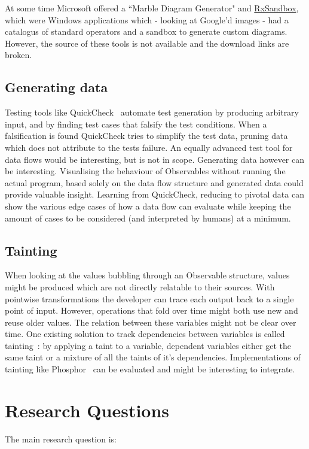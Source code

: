 \documentclass[11pt,a4paper]{article}
\begin{document}
At some time Microsoft offered a ``Marble Diagram Generator" and \href{http://mnajder.blogspot.nl/2010/03/rxsandbox-v1.html}{RxSandbox}, which were Windows applications which - looking at Google'd images - had a catalogus of standard operators and a sandbox to generate custom diagrams. However, the source of these tools is not available and the download links are broken.

\subsection{Generating data}
Testing tools like QuickCheck~\cite{quickcheck} automate test generation by producing arbitrary input, and by finding test cases that falsify the test conditions. When a falsification is found QuickCheck tries to simplify the test data, pruning data which does not attribute to the tests failure. An equally advanced test tool for data flows would be interesting, but is not in scope. Generating data however can be interesting. Visualising the behaviour of Observables without running the actual program, based solely on the data flow structure and generated data could provide valuable insight. Learning from QuickCheck, reducing to pivotal data can show the various edge cases of how a data flow can evaluate while keeping the amount of cases to be considered (and interpreted by humans) at a minimum.

\subsection{Tainting}
When looking at the values bubbling through an Observable structure, values might be produced which are not directly relatable to their sources. With pointwise transformations the developer can trace each output back to a single point of input. However, operations that fold over time might both use new and reuse older values. The relation between these variables might not be clear over time. One existing solution to track dependencies between variables is called tainting~\cite{bell2015dynamic}: by applying a taint to a variable, dependent variables either get the same taint or a mixture of all the taints of it's dependencies. Implementations of tainting like Phosphor~\cite{bell2014phosphor} can be evaluated and might be interesting to integrate.

\section{Research Questions}
The main research question is:
\end{document}
